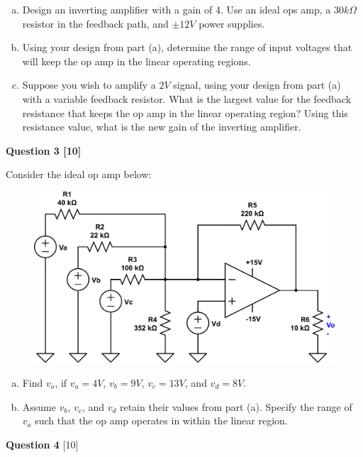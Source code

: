 \documentclass[12pt]{article}
\begin{document}
\begin{enumerate}[(a)]
\item Design an inverting amplifier with a gain of 4. Use an ideal ops amp, a $30 k \Omega$ resistor in the feedback path, and $\pm 12V$ power supplies. 
\item Using your design from part (a), determine the range of input voltages that will keep the op amp in the linear operating regions.  
\item Suppose you wish to amplify a $2V$ signal, using your design from part (a) with a variable feedback resistor. What is the largest value for the feedback resistance that keeps the op amp in the linear operating region? Using this resistance value, what is the new gain of the inverting amplifier. 
\end{enumerate}

\newpage

{\bf Question 3 [10]} %

Consider the ideal op amp below:

\begin{figure}[h!]
\begin{center}
 \includegraphics[scale=0.4]{p5_16.png}
\end{center}
\end{figure}

\begin{enumerate}[(a)]
\item Find $v_o$, if $v_a = 4V$, $v_b = 9V$, $v_c = 13V$, and $v_d = 8V$.
\item Assume $v_b$, $v_c$, and $v_d$ retain their values from part (a). Specify the range of $v_a$ such that the op amp operates in within the linear region.
\end{enumerate}

{\bf Question 4} [10] %
\end{document}
